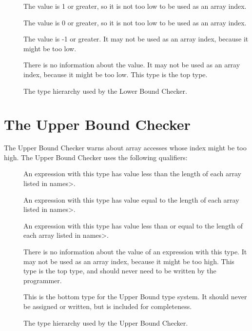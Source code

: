 \begin{description}
\item[]
  The value is 1 or greater, so it is not too low to be used as an array index.
\item[]
  The value is 0 or greater, so it is not too low to be used as an array index.
\item[]
  The value is -1 or greater.
  It may not be used as an array index, because it might be too low.
\item[]
  There is no information about the value.
  It may not be used as an array index, because it might be too low.
  This type is the top type.
\end{description}

\begin{figure}
  \caption{The type hierarchy used by the Lower Bound Checker.}
  \label{fig-lowerbound-types}
\end{figure}


\section{The Upper Bound Checker\label{index-upperbound}}

The Upper Bound Checker warns about array accesses whose index might be
too high. The Upper Bound Checker uses the following
qualifiers:

\begin{description}
\item[]
  An expression with this type
  has value less than the length of each array listed in \<names>.
\item[]
  An expression with this type
  has value equal to the length of each array listed in \<names>.
\item[]
  An expression with this type
  has value less than or equal to the length of each array listed in \<names>.
\item[]
  There is no information about the value of an expression with this type.
  It may not be used as an array index, because it might be too high.
  This type is the top type, and should never need to be written by the
  programmer.
\item[]
  This is the bottom type for the Upper Bound type system. It should
  never be assigned or written, but is included for completeness.
  \end{description}

\begin{figure}
  \caption{The type hierarchy used by the Upper Bound Checker.}
  \label{fig-upperbound-types}
\end{figure}
